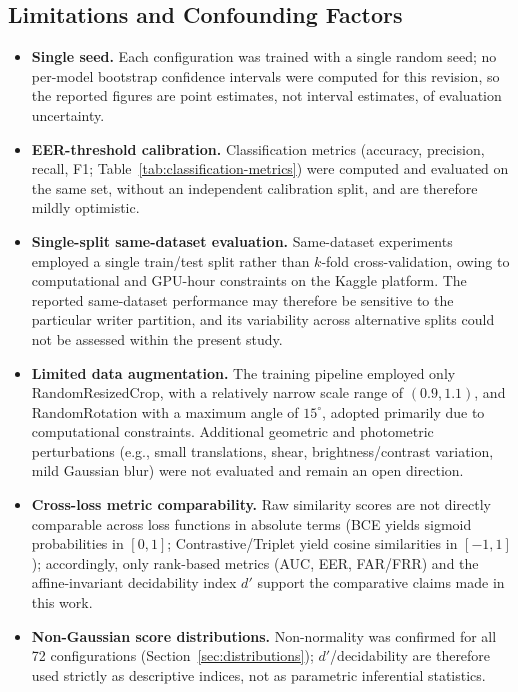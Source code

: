 \subsection{Limitations and Confounding Factors}
\label{sec:limitations}

\begin{itemize}
  \item \textbf{Single seed.} Each configuration was trained with a
  single random seed; no per-model bootstrap confidence intervals
  were computed for this revision, so the reported figures are point
  estimates, not interval estimates, of evaluation uncertainty.

  \item \textbf{EER-threshold calibration.} Classification metrics
  (accuracy, precision, recall, F1; Table~\ref{tab:classification-metrics})
  were computed and evaluated on the same set, without an independent
  calibration split, and are therefore mildly optimistic.

  \item \textbf{Single-split same-dataset evaluation.} Same-dataset
  experiments employed a single train/test split rather than
  $k$-fold cross-validation, owing to computational and GPU-hour
  constraints on the Kaggle platform. The reported same-dataset
  performance may therefore be sensitive to the particular writer
  partition, and its variability across alternative splits could not
  be assessed within the present study.

  \item \textbf{Limited data augmentation.} The training pipeline
  employed only RandomResizedCrop, with a relatively narrow scale
  range of $(0.9, 1.1)$, and RandomRotation with a maximum angle of
  $15^\circ$, adopted primarily due to computational constraints.
  Additional geometric and photometric perturbations (e.g., small
  translations, shear, brightness/contrast variation, mild Gaussian
  blur) were not evaluated and remain an open direction.

  \item \textbf{Cross-loss metric comparability.} Raw similarity
  scores are not directly comparable across loss functions in
  absolute terms (BCE yields sigmoid probabilities in $[0,1]$;
  Contrastive/Triplet yield cosine similarities in $[-1,1]$);
  accordingly, only rank-based metrics (AUC, EER, FAR/FRR) and the
  affine-invariant decidability index $d'$ support the comparative
  claims made in this work.

  \item \textbf{Non-Gaussian score distributions.} Non-normality was
  confirmed for all 72 configurations (Section~\ref{sec:distributions});
  $d'$/decidability are therefore used strictly as descriptive
  indices, not as parametric inferential statistics.


\end{itemize}
